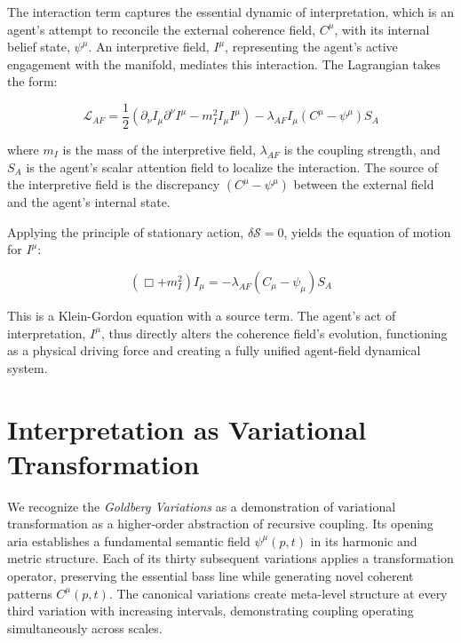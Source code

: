 The interaction term captures the essential dynamic of interpretation, which is an agent's attempt to reconcile the external coherence field, \(C^\mu\), with its internal belief state, \(\psi^\mu\). An interpretive field, \(I^\mu\), representing the agent's active engagement with the manifold, mediates this interaction. The Lagrangian takes the form:

\begin{equation}
\mathcal{L}_{AF} = \frac{1}{2} \left( \partial_\nu I_\mu \partial^\nu I^\mu - m_I^2 I_\mu I^\mu \right) - \lambda_{AF} I_\mu (C^\mu - \psi^\mu) S_A
\end{equation}

where \(m_I\) is the mass of the interpretive field, \(\lambda_{AF}\) is the coupling strength, and \(S_A\) is the agent's scalar attention field to localize the interaction. The source of the interpretive field is the discrepancy \((C^\mu - \psi^\mu)\) between the external field and the agent's internal state.

Applying the principle of stationary action, \(\delta \mathcal{S} = 0\), yields the equation of motion for \(I^\mu\):

\begin{equation}
(\Box + m_I^2) I_\mu = -\lambda_{AF} (C_\mu - \psi_\mu) S_A
\end{equation}

This is a Klein-Gordon equation with a source term. The agent's act of interpretation, \(I^\mu\), thus directly alters the coherence field's evolution, functioning as a physical driving force and creating a fully unified agent-field dynamical system.


\section{Interpretation as Variational Transformation}
\label{13.3:interpretation_as_variational_transformation}

We recognize the \textit{Goldberg Variations} \autocite{Bach1741} as a demonstration of variational transformation as a higher-order abstraction of recursive coupling. Its opening aria establishes a fundamental semantic field \(\psi^\mu(p,t)\) in its harmonic and metric structure. Each of its thirty subsequent variations applies a transformation operator, preserving the essential bass line while generating novel coherent patterns \(C^\mu(p,t)\). The canonical variations create meta-level structure at every third variation with increasing intervals, demonstrating coupling operating simultaneously across scales.

